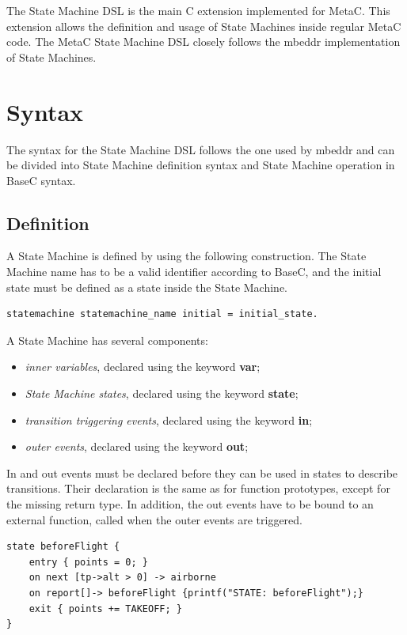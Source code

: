 \documentclass[a4paper,10pt,titlepage]{report}
\begin{document}
The State Machine DSL is the main C extension implemented for MetaC. This extension allows the definition and usage of State Machines inside regular MetaC code. The MetaC State Machine DSL closely follows the mbeddr implementation of State Machines.

\section{Syntax}
The syntax for the State Machine DSL follows the one used by mbeddr and can be divided into State Machine definition syntax and State Machine operation in BaseC syntax.
\subsection{Definition}
A State Machine is defined by using the following construction. The State Machine name has to be a valid identifier according to BaseC, and the initial state must be defined as a state inside the State Machine.

\begin{lstlisting}
statemachine statemachine_name initial = initial_state.
\end{lstlisting}

{\setlength{\parindent}{0cm}
A State Machine has several components:
}
\begin{itemize}
\item \emph{inner variables}, declared using the keyword \textbf{var};
\item \emph{State Machine states}, declared using the keyword \textbf{state};
\item \emph{transition triggering events}, declared using the keyword \textbf{in};
\item \emph{outer events}, declared using the keyword \textbf{out};
\end{itemize}
 
In and out events must be declared before they can be used in states to describe transitions. Their declaration is the same as for function prototypes, except for the missing return type. In addition, the out events have to be bound to an external function, called when the outer events are triggered.

\begin{lstlisting}
state beforeFlight {
    entry { points = 0; }
    on next [tp->alt > 0] -> airborne
    on report[]-> beforeFlight {printf("STATE: beforeFlight");}
    exit { points += TAKEOFF; }
}
\end{lstlisting}
\end{document}
